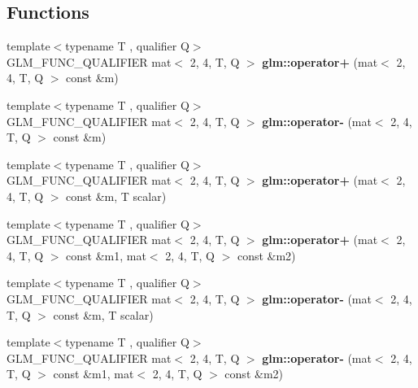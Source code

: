 \subsection*{Functions}
\begin{DoxyCompactItemize}
\item 
\mbox{\label{type__mat2x4_8inl_a6c868e41a6b8a1b7ff46f1a0daea39bf}} 
{\footnotesize template$<$typename T , qualifier Q$>$ }\\G\+L\+M\+\_\+\+F\+U\+N\+C\+\_\+\+Q\+U\+A\+L\+I\+F\+I\+ER mat$<$ 2, 4, T, Q $>$ {\bfseries glm\+::operator+} (mat$<$ 2, 4, T, Q $>$ const \&m)
\item 
\mbox{\label{type__mat2x4_8inl_a86be3118bcb466045645de5db4f40b0e}} 
{\footnotesize template$<$typename T , qualifier Q$>$ }\\G\+L\+M\+\_\+\+F\+U\+N\+C\+\_\+\+Q\+U\+A\+L\+I\+F\+I\+ER mat$<$ 2, 4, T, Q $>$ {\bfseries glm\+::operator-\/} (mat$<$ 2, 4, T, Q $>$ const \&m)
\item 
\mbox{\label{type__mat2x4_8inl_a6a7c908f0415b1e024cc59c6751218ad}} 
{\footnotesize template$<$typename T , qualifier Q$>$ }\\G\+L\+M\+\_\+\+F\+U\+N\+C\+\_\+\+Q\+U\+A\+L\+I\+F\+I\+ER mat$<$ 2, 4, T, Q $>$ {\bfseries glm\+::operator+} (mat$<$ 2, 4, T, Q $>$ const \&m, T scalar)
\item 
\mbox{\label{type__mat2x4_8inl_afcd04fef1025ed9872bec1c105f763eb}} 
{\footnotesize template$<$typename T , qualifier Q$>$ }\\G\+L\+M\+\_\+\+F\+U\+N\+C\+\_\+\+Q\+U\+A\+L\+I\+F\+I\+ER mat$<$ 2, 4, T, Q $>$ {\bfseries glm\+::operator+} (mat$<$ 2, 4, T, Q $>$ const \&m1, mat$<$ 2, 4, T, Q $>$ const \&m2)
\item 
\mbox{\label{type__mat2x4_8inl_a4d506c141ee2235d8dcfb58aa07a39a9}} 
{\footnotesize template$<$typename T , qualifier Q$>$ }\\G\+L\+M\+\_\+\+F\+U\+N\+C\+\_\+\+Q\+U\+A\+L\+I\+F\+I\+ER mat$<$ 2, 4, T, Q $>$ {\bfseries glm\+::operator-\/} (mat$<$ 2, 4, T, Q $>$ const \&m, T scalar)
\item 
\mbox{\label{type__mat2x4_8inl_acbce8ab63560d360193f96e82c40b1bc}} 
{\footnotesize template$<$typename T , qualifier Q$>$ }\\G\+L\+M\+\_\+\+F\+U\+N\+C\+\_\+\+Q\+U\+A\+L\+I\+F\+I\+ER mat$<$ 2, 4, T, Q $>$ {\bfseries glm\+::operator-\/} (mat$<$ 2, 4, T, Q $>$ const \&m1, mat$<$ 2, 4, T, Q $>$ const \&m2)

\end{DoxyCompactItemize}
